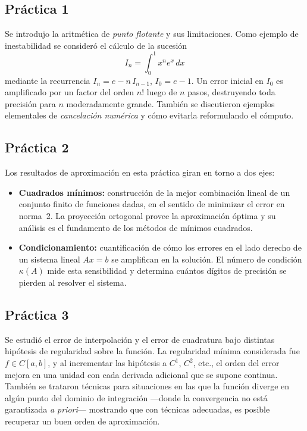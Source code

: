 \documentclass[12pt]{article}
\begin{document}
\subsection*{Práctica 1}

Se introdujo la aritmética de \emph{punto flotante} y sus limitaciones. Como ejemplo de inestabilidad se consideró el cálculo de la sucesión
\[
  I_n = \int_0^1 x^n e^x\, dx
\]
mediante la recurrencia $I_n = e - n\, I_{n-1}$, $I_0 = e - 1$. Un error inicial en $I_0$ es amplificado por un factor del orden $n!$ luego de $n$ pasos, destruyendo toda precisión para $n$ moderadamente grande. También se discutieron ejemplos elementales de \emph{cancelación numérica} y cómo evitarla reformulando el cómputo.

\subsection*{Práctica 2}

Los resultados de aproximación en esta práctica giran en torno a dos ejes:

\begin{itemize}
  \item \textbf{Cuadrados mínimos:} construcción de la mejor combinación lineal de un conjunto finito de funciones dadas, en el sentido de minimizar el error en norma~2. La proyección ortogonal provee la aproximación óptima y su análisis es el fundamento de los métodos de mínimos cuadrados.
  \item \textbf{Condicionamiento:} cuantificación de cómo los errores en el lado derecho de un sistema lineal $Ax = b$ se amplifican en la solución. El número de condición $\kappa(A)$ mide esta sensibilidad y determina cuántos dígitos de precisión se pierden al resolver el sistema.
\end{itemize}

\subsection*{Práctica 3}

Se estudió el error de interpolación y el error de cuadratura bajo distintas hipótesis de regularidad sobre la función. La regularidad mínima considerada fue $f \in C[a,b]$, y al incrementar las hipótesis a $C^1$, $C^2$, etc., el orden del error mejora en una unidad con cada derivada adicional que se supone continua. También se trataron técnicas para situaciones en las que la función diverge en algún punto del dominio de integración ---donde la convergencia no está garantizada \emph{a priori}--- mostrando que con técnicas adecuadas, es posible recuperar un buen orden de aproximación.
\end{document}
